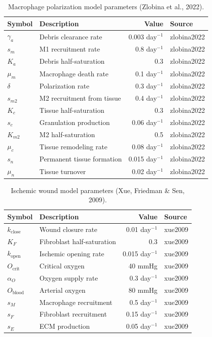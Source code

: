 \documentclass[11pt,a4paper]{article}
\begin{document}
\begin{table}[h]
\centering
\caption{Macrophage polarization model parameters (Zlobina et al., 2022).}
\begin{tabular}{@{}llrl@{}}
\toprule
Symbol & Description & Value & Source \\
\midrule
$\gamma_a$ & Debris clearance rate & 0.003 day$^{-1}$ & zlobina2022 \\
$s_m$ & M1 recruitment rate & 0.8 day$^{-1}$ & zlobina2022 \\
$K_a$ & Debris half-saturation & 0.3 & zlobina2022 \\
$\mu_m$ & Macrophage death rate & 0.1 day$^{-1}$ & zlobina2022 \\
$\delta$ & Polarization rate & 0.3 day$^{-1}$ & zlobina2022 \\
$s_{m2}$ & M2 recruitment from tissue & 0.4 day$^{-1}$ & zlobina2022 \\
$K_c$ & Tissue half-saturation & 0.3 & zlobina2022 \\
$s_c$ & Granulation production & 0.06 day$^{-1}$ & zlobina2022 \\
$K_{m2}$ & M2 half-saturation & 0.5 & zlobina2022 \\
$\mu_c$ & Tissue remodeling rate & 0.08 day$^{-1}$ & zlobina2022 \\
$s_n$ & Permanent tissue formation & 0.015 day$^{-1}$ & zlobina2022 \\
$\mu_n$ & Tissue turnover & 0.02 day$^{-1}$ & zlobina2022 \\
\bottomrule
\end{tabular}
\end{table}

\begin{table}[h]
\centering
\caption{Ischemic wound model parameters (Xue, Friedman \& Sen, 2009).}
\begin{tabular}{@{}llrl@{}}
\toprule
Symbol & Description & Value & Source \\
\midrule
$k_{\text{close}}$ & Wound closure rate & 0.01 day$^{-1}$ & xue2009 \\
$K_F$ & Fibroblast half-saturation & 0.3 & xue2009 \\
$k_{\text{open}}$ & Ischemic opening rate & 0.015 day$^{-1}$ & xue2009 \\
$O_{\text{crit}}$ & Critical oxygen & 40 mmHg & xue2009 \\
$\alpha_O$ & Oxygen supply rate & 0.3 day$^{-1}$ & xue2009 \\
$O_{\text{blood}}$ & Arterial oxygen & 80 mmHg & xue2009 \\
$s_M$ & Macrophage recruitment & 0.5 day$^{-1}$ & xue2009 \\
$s_F$ & Fibroblast recruitment & 0.15 day$^{-1}$ & xue2009 \\
$s_E$ & ECM production & 0.05 day$^{-1}$ & xue2009 \\
\bottomrule
\end{tabular}
\end{table}
\end{document}
